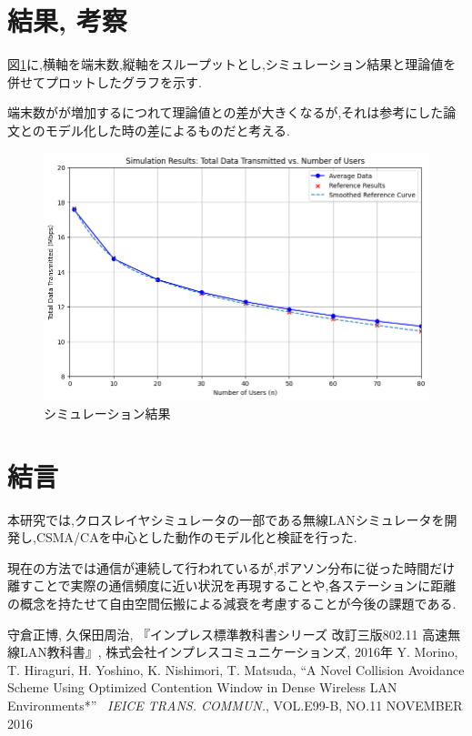 \documentclass[a4paper, 10pt]{ltjsarticle}
\begin{document}
\section{結果, 考察}
図\ref{fig:simulation-result}に,横軸を端末数,縦軸をスループットとし,シミュレーション結果と理論値を併せてプロットしたグラフを示す.

端末数がが増加するにつれて理論値との差が大きくなるが,それは参考にした論文\cite{paper}とのモデル化した時の差によるものだと考える.

\begin{figure}[H]
  \centering
  \includegraphics[width=1\columnwidth]{./assets/g3.png}
  \caption{シミュレーション結果}
  \label{fig:simulation-result}
\end{figure}


\section{結言}
本研究では,クロスレイヤシミュレータの一部である無線LANシミュレータを開発し,CSMA/CAを中心とした動作のモデル化と検証を行った.

現在の方法では通信が連続して行われているが,ポアソン分布に従った時間だけ離すことで実際の通信頻度に近い状況を再現することや,各ステーションに距離の概念を持たせて自由空間伝搬による減衰を考慮することが今後の課題である.

\begin{thebibliography}{9}
  守倉正博, 久保田周治, 『インプレス標準教科書シリーズ 改訂三版802.11 高速無線LAN教科書』, 株式会社インプレスコミュニケーションズ, 2016年
  Y. Morino, T. Hiraguri, H. Yoshino, K. Nishimori, T. Matsuda, ``A Novel Collision Avoidance Scheme Using Optimized Contention Window in Dense Wireless LAN Environments*'' \, \textit{IEICE TRANS. COMMUN.}, VOL.E99-B, NO.11 NOVEMBER 2016
\end{thebibliography}
\end{document}
